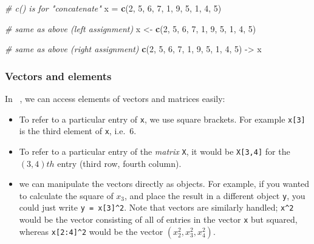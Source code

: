 \documentclass[12pt,a4paper,openany,twoside]{report}
\newenvironment{Shaded}{\begin{snugshade}}{\end{snugshade}}
\newcommand{\CommentTok}[1]{\textcolor[rgb]{0.56,0.35,0.01}{\textit{#1}}}
\newcommand{\DecValTok}[1]{\textcolor[rgb]{0.00,0.00,0.81}{#1}}
\newcommand{\KeywordTok}[1]{\textcolor[rgb]{0.13,0.29,0.53}{\textbf{#1}}}
\newcommand{\NormalTok}[1]{#1}
\newcommand{\StringTok}[1]{\textcolor[rgb]{0.31,0.60,0.02}{#1}}
\renewcommand{\emph}[1]{\textcolor{Emerald}{\textit{#1}}}
\theoremstyle{definition}
\theoremstyle{remark}
\theoremstyle{plain}
\newcommand{\vsps}{\vspace{.5cm}}
\newcommand{\sR}[1]{\textbf{R}\,}
\theoremstyle{definition}
\theoremstyle{definition}
\theoremstyle{definition}
\theoremstyle{remark}
\begin{document}
\begin{Shaded}
\begin{Highlighting}[]
\CommentTok{# c() is for "concatenate"}
\NormalTok{x =}\StringTok{ }\KeywordTok{c}\NormalTok{(}\DecValTok{2}\NormalTok{, }\DecValTok{5}\NormalTok{, }\DecValTok{6}\NormalTok{, }\DecValTok{7}\NormalTok{, }\DecValTok{1}\NormalTok{, }\DecValTok{9}\NormalTok{, }\DecValTok{5}\NormalTok{, }\DecValTok{1}\NormalTok{, }\DecValTok{4}\NormalTok{, }\DecValTok{5}\NormalTok{)}

\CommentTok{# same as above (left assignment)}
\NormalTok{x <-}\StringTok{ }\KeywordTok{c}\NormalTok{(}\DecValTok{2}\NormalTok{, }\DecValTok{5}\NormalTok{, }\DecValTok{6}\NormalTok{, }\DecValTok{7}\NormalTok{, }\DecValTok{1}\NormalTok{, }\DecValTok{9}\NormalTok{, }\DecValTok{5}\NormalTok{, }\DecValTok{1}\NormalTok{, }\DecValTok{4}\NormalTok{, }\DecValTok{5}\NormalTok{)}

\CommentTok{# same as above (right assignment)}
\KeywordTok{c}\NormalTok{(}\DecValTok{2}\NormalTok{, }\DecValTok{5}\NormalTok{, }\DecValTok{6}\NormalTok{, }\DecValTok{7}\NormalTok{, }\DecValTok{1}\NormalTok{, }\DecValTok{9}\NormalTok{, }\DecValTok{5}\NormalTok{, }\DecValTok{1}\NormalTok{, }\DecValTok{4}\NormalTok{, }\DecValTok{5}\NormalTok{) ->}\StringTok{ }\NormalTok{x}
\end{Highlighting}
\end{Shaded}

\vsps

\hypertarget{vectors-and-elements}{%
\subsubsection*{Vectors and elements}\label{vectors-and-elements}}

In \sR~, we can access elements of vectors and matrices easily:

\begin{itemize}
\item
  To refer to a particular entry of \texttt{x}, we use square brackets. For example \texttt{x{[}3{]}} is the third element of \texttt{x}, i.e.~6.
\item
  To refer to a particular entry of the \emph{matrix} \texttt{X}, it would be \texttt{X{[}3,4{]}} for the \((3,4)th\) entry (third row, fourth column).
\item
  we can manipulate the vectors directly as objects. For example, if you wanted to calculate the square of \(x_3\), and place the
  result in a different object \texttt{y}, you could just write \texttt{y\ =\ x{[}3{]}\^{}2}. Note that vectors are similarly handled; \texttt{x\^{}2} would be the vector consisting of all of entries in the vector \texttt{x} but squared, whereas \texttt{x{[}2:4{]}\^{}2} would be the vector \((x_2^2,x_3^2,x_4^2)\).
\end{itemize}
\end{document}
